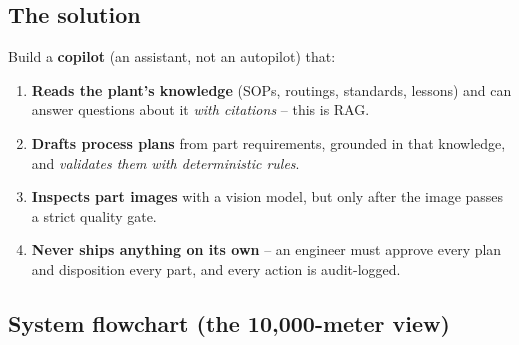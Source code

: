 \documentclass[11pt,a4paper]{article}
\begin{document}
\subsection{The solution}
Build a \textbf{copilot} (an assistant, not an autopilot) that:
\begin{enumerate}[nosep]
  \item \textbf{Reads the plant's knowledge} (SOPs, routings, standards, lessons) and
        can answer questions about it \emph{with citations} -- this is RAG.
  \item \textbf{Drafts process plans} from part requirements, grounded in that
        knowledge, and \emph{validates them with deterministic rules}.
  \item \textbf{Inspects part images} with a vision model, but only after the image
        passes a strict quality gate.
  \item \textbf{Never ships anything on its own} -- an engineer must approve every
        plan and disposition every part, and every action is audit-logged.
\end{enumerate}

\subsection{System flowchart (the 10,000-meter view)}
\end{document}
